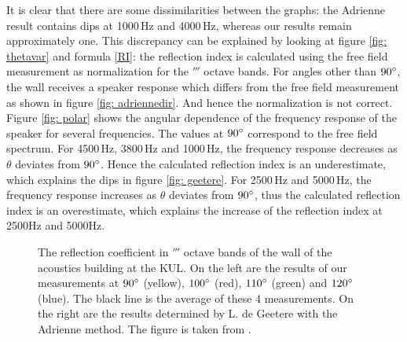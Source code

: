 It is clear that there are some dissimilarities between the graphs: the Adrienne result contains dips at 1000\,Hz and 4000\,Hz, whereas our results remain approximately one. This discrepancy can be explained by looking at figure \ref{fig: thetavar} and formula \ref{RI}: the reflection index is calculated using the free field measurement as normalization for the $\third$ octave bands. For angles other than $90^{\circ}$, the wall receives a  speaker response which differs from the free field measurement as shown in figure \ref{fig: adriennedir}. And hence the normalization is not correct. Figure \ref{fig: polar} shows the angular dependence of the frequency response of the speaker for several frequencies. The values at $90^{\circ}$ correspond to the free field spectrum. For 4500\,Hz, 3800\,Hz and 1000\,Hz, the frequency response decreases as $\theta$ deviates from $90^{\circ}$. Hence the calculated reflection index is an underestimate, which explains the dips in figure \ref{fig: geetere}. For 2500\,Hz and 5000\,Hz, the frequency response increases as $\theta$ deviates from $90^{\circ}$, thus the calculated reflection index is an overestimate, which explains the increase of the reflection index at 2500Hz and 5000Hz. 

\begin{figure}[h!]
  \centering
  \caption{The reflection coefficient in $\third$ octave bands of the wall of the acoustics building at the KUL. On the left are the results of our measurements at $90^{\circ}$ (yellow), $100^{\circ}$ (red), $110^{\circ}$ (green) and $120^{\circ}$ (blue). The black line is the average of these 4 measurements. On the right are the results determined by L. de Geetere with the Adrienne method. The figure is taken from \cite[p.68]{Geetere}.}
  \label{fig: reflection}
\end{figure}



